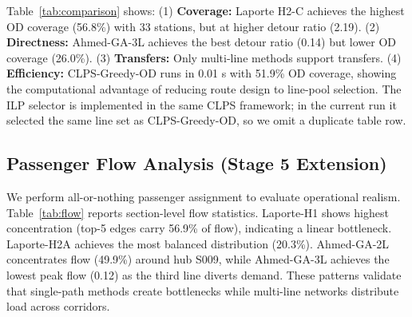 \documentclass[conference]{IEEEtran}
\begin{document}
\begin{table}[!t]
\centering
\caption{Comprehensive comparison of all methods on Shanghai data.}
\label{tab:comparison}
\scriptsize
\setlength{\tabcolsep}{2pt}
\end{table}

Table~\ref{tab:comparison} shows: (1) \textbf{Coverage:} Laporte H2-C
achieves the highest OD coverage (56.8\%) with 33 stations, but at higher
detour ratio (2.19). (2) \textbf{Directness:} Ahmed-GA-3L achieves the
best detour ratio (0.14) but lower OD coverage (26.0\%). (3)
\textbf{Transfers:} Only multi-line methods support transfers. (4)
\textbf{Efficiency:} CLPS-Greedy-OD runs in 0.01 s with 51.9\% OD
coverage, showing the computational advantage of reducing route design to
line-pool selection. The ILP selector is implemented in the same CLPS
framework; in the current run it selected the same line set as
CLPS-Greedy-OD, so we omit a duplicate table row.

\subsection{Passenger Flow Analysis (Stage 5 Extension)}

We perform all-or-nothing passenger assignment to evaluate operational
realism. Table~\ref{tab:flow} reports section-level flow statistics.
Laporte-H1 shows highest concentration (top-5 edges carry 56.9\% of flow),
indicating a linear bottleneck. Laporte-H2A achieves the most balanced
distribution (20.3\%). Ahmed-GA-2L concentrates flow (49.9\%) around hub
S009, while Ahmed-GA-3L achieves the lowest peak flow (0.12) as the third
line diverts demand. These patterns validate that single-path methods create
bottlenecks while multi-line networks distribute load across corridors.
\end{document}
